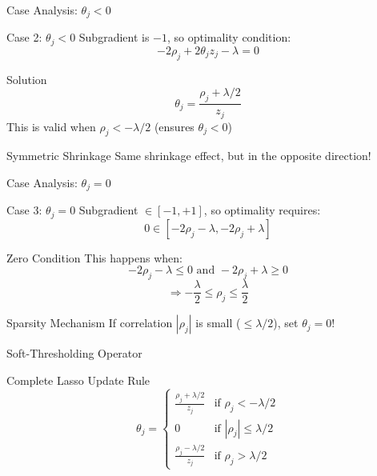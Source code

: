 \documentclass{beamer}
\begin{document}
\begin{frame}{Case Analysis: $\theta_j < 0$}
\begin{codebox}{Case 2: $\theta_j < 0$}
Subgradient is $-1$, so optimality condition:
$$-2\rho_j + 2\theta_j z_j - \lambda = 0$$
\end{codebox}
\pause

\begin{theorembox}{Solution}
$$\theta_j = \frac{\rho_j + \lambda/2}{z_j}$$
This is valid when $\rho_j < -\lambda/2$ (ensures $\theta_j < 0$)
\end{theorembox}
\pause

\begin{alertbox}{Symmetric Shrinkage}
Same shrinkage effect, but in the opposite direction!
\end{alertbox}
\end{frame}

\begin{frame}{Case Analysis: $\theta_j = 0$}
\begin{codebox}{Case 3: $\theta_j = 0$}
Subgradient $\in [-1,+1]$, so optimality requires:
$$0 \in [-2\rho_j - \lambda, -2\rho_j + \lambda]$$
\end{codebox}
\pause

\begin{theorembox}{Zero Condition}
This happens when:
$$-2\rho_j - \lambda \leq 0 \text{ and } -2\rho_j + \lambda \geq 0$$
$$\Rightarrow -\frac{\lambda}{2} \leq \rho_j \leq \frac{\lambda}{2}$$
\end{theorembox}
\pause

\begin{alertbox}{Sparsity Mechanism}
If correlation $|\rho_j|$ is small ($ \leq \lambda/2$), set $\theta_j = 0$!
\end{alertbox}
\end{frame}
\begin{frame}{Soft-Thresholding Operator}
\begin{definitionbox}{Complete Lasso Update Rule}
{\small
$$\theta_{j} = \begin{cases}
\frac{\rho_{j} + \lambda/2}{z_{j}} & \text{if } \rho_{j} < -\lambda/2 \\
0 & \text{if } |\rho_{j}| \leq \lambda/2 \\
\frac{\rho_{j} - \lambda/2}{z_{j}} & \text{if } \rho_{j} > \lambda/2
\end{cases}$$
}
\end{definitionbox}
\end{frame}
\end{document}
